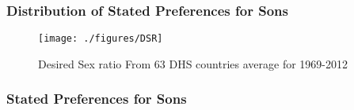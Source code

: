 \documentclass[9pt,letterpaper,subeqn]{beamer}
\begin{document}
\begin{frame}[label=DSRMap]
\frametitle{Distribution of Stated Preferences for Sons}
  \begin{figure}[h!]
\centering
\caption{Desired Sex ratio From 63 DHS countries average for 1969-2012}
\texttt{[image: ./figures/DSR]}
\end{figure}
\end{frame}


\begin{frame}[label=DSRanalysis]
\frametitle{Stated Preferences for Sons} 

\end{frame}
\end{document}
